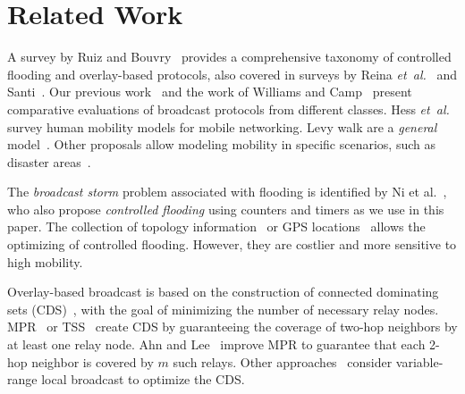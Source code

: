 
\section{Related Work}
\label{sec:related}


A survey by Ruiz and Bouvry~\cite{ruiz2015survey} provides a comprehensive taxonomy of controlled flooding and overlay-based protocols, also covered in surveys by Reina \emph{et~al.}~\cite{Reina2015} and Santi~\cite{Santi:2005:TCW:1089733.1089736}.
%
Our previous work~\cite{DensityMobDrivenEval} and the work of Williams and Camp~\cite{Williams2002} present comparative evaluations of broadcast protocols from different classes.
Hess \emph{et~al.}~\cite{Hess:2015:DHM:2856149.2840722} survey human mobility models for mobile networking.
Levy walk are a \emph{general} model~\cite{rhee2011levy}.
Other proposals allow modeling mobility in specific scenarios, such as disaster areas~\cite{Aschenbruck2009}.

The \emph{broadcast storm} problem associated with flooding is identified by Ni et al.~\cite{BroadcastStormProblem}, who also propose \emph{controlled flooding} using counters and timers as we use in this paper.
The collection of topology information~\cite{ProbFlood} or GPS locations~\cite{abba} allows the optimizing of controlled flooding. However, they are costlier and more sensitive to high mobility.

Overlay-based broadcast is based on the construction of connected dominating sets (CDS)~\cite{stojmenovic-cds}, with the goal of minimizing the number of necessary relay nodes.
MPR~\cite{mpr} or TSS~\cite{Nikolov2015} create CDS by guaranteeing the coverage of two-hop neighbors by at least one relay node.
Ahn and Lee~\cite{mpr-improvement} improve MPR to guarantee that each 2-hop neighbor is covered by $m$ such relays.
Other approaches~\cite{woon2011variable,park2013efficient} consider variable-range local broadcast to optimize the CDS.


